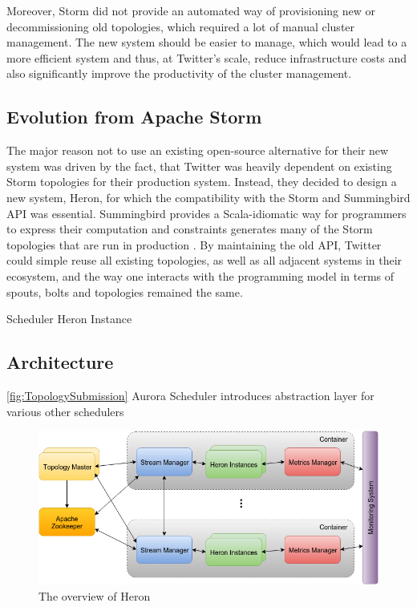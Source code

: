 \documentclass[conference]{IEEEtran}
\begin{document}
Moreover, Storm did not provide an automated way of provisioning new or decommissioning old topologies, which required a lot of manual cluster management.
The new system should be easier to manage, which would lead to a more efficient system and thus, at Twitter's scale, reduce infrastructure costs and also significantly improve the productivity of the cluster management.

\subsection{Evolution from Apache Storm}
\label{sec:EvolutionFromApacheStorm}

The major reason not to use an existing open-source alternative for their new system was driven by the fact, that Twitter was heavily dependent on existing Storm topologies for their production system.
Instead, they decided to design a new system, Heron, for which the compatibility with the Storm and Summingbird API was essential.
Summingbird provides a Scala-idiomatic way for programmers to express their computation and constraints generates many of the Storm topologies that are run in production \cite{Summingbird}.
By maintaining the old API, Twitter could simple reuse all existing topologies, as well as all adjacent systems in their ecosystem, and the way one interacts with the programming model in terms of spouts, bolts and topologies remained the same.

Scheduler
Heron Instance

\subsection{Architecture}
\label{sec:TwitterHeronArchitecture}

\ref{fig:TopologySubmission}
Aurora Scheduler introduces abstraction layer for 
various other schedulers

\cite{Aurora}
\cite{YARN}



\begin{figure}[!tp]
    \centering
    \includegraphics[scale=0.45]{figures/HeronOverview}
    \caption{The overview of Heron}
    \label{fig:HeronOverview}
\end{figure}
\end{document}
